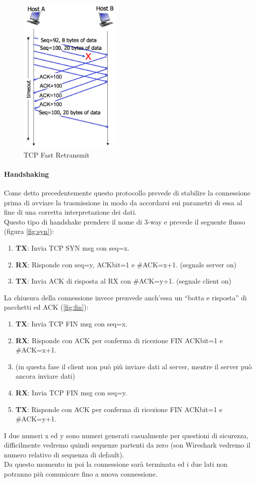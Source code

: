 \documentclass[12pt]{article}
\begin{document}
\begin{figure}[!hbpt]
  \centering
  \includegraphics[width=5cm]{images/tcpfr.png}
  \caption{TCP Fast Retransmit}
  \label{fig:tcpfr}
\end{figure}

\paragraph{Handshaking} Come detto precedentemente questo protocollo prevede di stabilire la connessione prima di avviare la trasmissione in modo da accordarsi sui parametri di essa al fine di una corretta interpretazione dei dati.\\
Questo tipo di handshake prendere il nome di 3-way e prevede il seguente flusso (figura \ref{fig:syn}):
\begin{enumerate}
  \item \textbf{TX}: Invia TCP SYN msg con seq=x.
  \item \textbf{RX}: Risponde con seq=y, ACKbit=1 e \#ACK=x+1. (segnale server on)
  \item \textbf{TX}: Invia ACK di risposta al RX con \#ACK=y+1. (segnale client on)
\end{enumerate}
La chiusura della connessione invece prenvede anch'essa un ``botta e risposta'' di pacchetti ed ACK (\ref{fig:fin}):
\begin{enumerate}
  \item \textbf{TX}: Invia TCP FIN msg con seq=x.
  \item \textbf{RX}: Risponde con ACK per conferma di ricezione FIN ACKbit=1 e \#ACK=x+1.
  \item (in questa fase il client non può più inviare dati al server, mentre il server può ancora inviare dati)
  \item \textbf{RX}: Invia TCP FIN msg con seq=y.
  \item \textbf{TX}: Risponde con ACK per conferma di ricezione FIN ACKbit=1 e \#ACK=y+1.
\end{enumerate}
I due numeri x ed y sono numeri generati casualmente per questioni di sicurezza, difficilmente vedremo quindi sequenze partenti da zero (son Wireshark vedremo il numero relativo di sequenza di default).\\
Da questo momento in poi la connessione sarà terminata ed i due lati non potranno più comunicare fino a nuova connessione.
\end{document}

